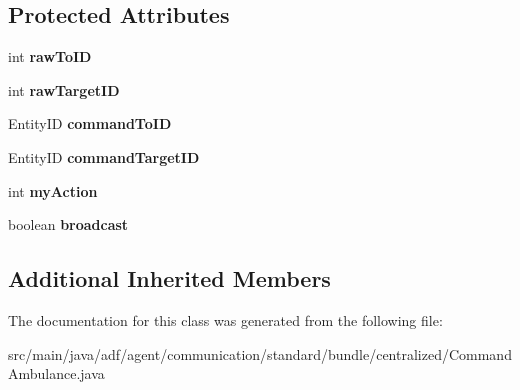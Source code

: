 \subsection*{Protected Attributes}
\begin{DoxyCompactItemize}
\item 
\hypertarget{classadf_1_1agent_1_1communication_1_1standard_1_1bundle_1_1centralized_1_1CommandAmbulance_a97e8b4990f2dc4993cf7a5d688ba75d0}{}\label{classadf_1_1agent_1_1communication_1_1standard_1_1bundle_1_1centralized_1_1CommandAmbulance_a97e8b4990f2dc4993cf7a5d688ba75d0} 
int {\bfseries raw\+To\+ID}
\item 
\hypertarget{classadf_1_1agent_1_1communication_1_1standard_1_1bundle_1_1centralized_1_1CommandAmbulance_aa4f86ac3f5617b3f738a04f0a53f12ea}{}\label{classadf_1_1agent_1_1communication_1_1standard_1_1bundle_1_1centralized_1_1CommandAmbulance_aa4f86ac3f5617b3f738a04f0a53f12ea} 
int {\bfseries raw\+Target\+ID}
\item 
\hypertarget{classadf_1_1agent_1_1communication_1_1standard_1_1bundle_1_1centralized_1_1CommandAmbulance_aaf63382e49a330ea42fd060dfdff00a2}{}\label{classadf_1_1agent_1_1communication_1_1standard_1_1bundle_1_1centralized_1_1CommandAmbulance_aaf63382e49a330ea42fd060dfdff00a2} 
Entity\+ID {\bfseries command\+To\+ID}
\item 
\hypertarget{classadf_1_1agent_1_1communication_1_1standard_1_1bundle_1_1centralized_1_1CommandAmbulance_a98e8a6ff76f44059b4ac618081b27dbe}{}\label{classadf_1_1agent_1_1communication_1_1standard_1_1bundle_1_1centralized_1_1CommandAmbulance_a98e8a6ff76f44059b4ac618081b27dbe} 
Entity\+ID {\bfseries command\+Target\+ID}
\item 
\hypertarget{classadf_1_1agent_1_1communication_1_1standard_1_1bundle_1_1centralized_1_1CommandAmbulance_a7a1d5eabbf6f39432b1ffef0ec43c8b2}{}\label{classadf_1_1agent_1_1communication_1_1standard_1_1bundle_1_1centralized_1_1CommandAmbulance_a7a1d5eabbf6f39432b1ffef0ec43c8b2} 
int {\bfseries my\+Action}
\item 
\hypertarget{classadf_1_1agent_1_1communication_1_1standard_1_1bundle_1_1centralized_1_1CommandAmbulance_aa5ea84c7be093e98ffc7268a934c416d}{}\label{classadf_1_1agent_1_1communication_1_1standard_1_1bundle_1_1centralized_1_1CommandAmbulance_aa5ea84c7be093e98ffc7268a934c416d} 
boolean {\bfseries broadcast}
\end{DoxyCompactItemize}
\subsection*{Additional Inherited Members}


The documentation for this class was generated from the following file\+:\begin{DoxyCompactItemize}
\item 
src/main/java/adf/agent/communication/standard/bundle/centralized/Command\+Ambulance.\+java\end{DoxyCompactItemize}
